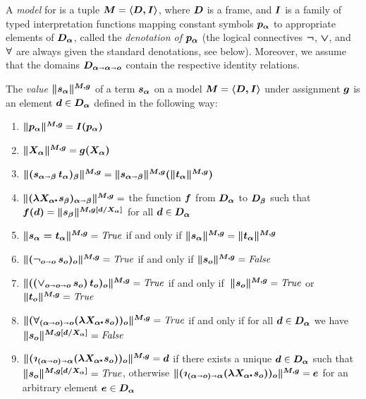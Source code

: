 \begin{definition}\label{holmodel}
  A \emph{model} for \HOL is a tuple $\boldsymbol{M}=\boldsymbol{\langle D, I \rangle}$, where
  $\boldsymbol{D}$ is a frame, and $\boldsymbol{I}$ is a family of typed interpretation
  functions mapping constant symbols $\boldsymbol{p_\alpha}$ to appropriate
  elements of $\boldsymbol{D_\alpha}$, called the \emph{denotation of $\boldsymbol{p_\alpha}$}
  (the logical connectives $\boldsymbol{\neg}$, $\boldsymbol{\vee}$, and $\boldsymbol{\forall}$ are always
  given the standard denotations, see below).  Moreover, we assume that the domains
  $\boldsymbol{D_{\alpha\shortrightarrow\alpha\shortrightarrow o}}$ contain the respective identity relations.
\end{definition}


\begin{definition}\label{holvalue}
  The \emph{value} $\boldsymbol{\| s_\alpha\|^{M,g}}$ of a \HOL term
  $\boldsymbol{s_\alpha}$ on a model $\boldsymbol{M}=\boldsymbol{\langle D, I \rangle}$ under assignment $\boldsymbol{g}$ is an element $\boldsymbol{d}\in \boldsymbol{D_\alpha}$
  defined in the following way:
\begin{enumerate}
\item $\boldsymbol{\|p_\alpha\|^{M,g}} = \boldsymbol{I(p_\alpha)}$ 
\item $\boldsymbol{\|X_\alpha\|^{M,g}} = \boldsymbol{g(X_\alpha)}$
\item $\boldsymbol{\|(s_{\alpha\shortrightarrow\beta}\, t_\alpha)_\beta\|^{M,g}} = \boldsymbol{\|s_{\alpha\shortrightarrow\beta}\|^{M,g}(\|t_\alpha\|^{M,g})}$
\item $\hol{\|(\lam{X_\alpha}s_\beta)_{\alpha\ar\beta}\|^{M,g}} = $
  the function $\boldsymbol{f}$ from $\boldsymbol{D_\alpha}$ to $\boldsymbol{D_\beta}$ such
  that $\boldsymbol{f(d)} = \boldsymbol{\|s_\beta\|^{M,g[d/X_\alpha]}}$ for all
  $\boldsymbol{d}\in \boldsymbol{D_\alpha}$
\item $\boldsymbol{\|s_\alpha = t_\alpha\|^{M,g}} = {\mathit{True}}$ if and only if $\boldsymbol{\|s_\alpha\|^{M,g}} = \boldsymbol{\|t_\alpha\|^{M,g}} $
\item $\boldsymbol{\|(\neg_{o\shortrightarrow o}\, s_o)_o\|^{M,g}} = {\mathit{True}}$ if and only if $\boldsymbol{\|s_o\|^{M,g}} = {\mathit{False}}$
\item $\boldsymbol{\|(({\vee_{o\shortrightarrow o\shortrightarrow o}}\,s_o)\,t_o)_o\|^{M,g}} =
  {\mathit{True}}$ if and only if\, $\boldsymbol{\|s_o\|^{M,g}} = {\mathit{True}}$ or $\boldsymbol{\|t_o\|^{M,g}}
  = {\mathit{True}}$
\item \sloppy $\hol{\|(\forall_{(\alpha\ar o)\ar o}(\lam{X_\alpha}
    s_o))_o\|^{M,g}} = {\True}$ if and only if for all $\boldsymbol{d}\in
  \boldsymbol{D_\alpha}$ we have $\boldsymbol{\|s_o\|^{M,g[d/X_\alpha]}} = {\mathit{False}}$
\item $\hol{\|(\Descr_{(\alpha\ar o)\ar \alpha}(\lam{X_\alpha}
    s_o))_o\|^{M,g}} = \hol{d}$ if there exists a unique $\boldsymbol{d}\in \boldsymbol{D_{\alpha}}$ such that
  $\boldsymbol{\|s_o\|^{M,g[d/X_\alpha]}} = {\mathit{True}}$, 
otherwise  $\hol{\|(\Descr_{(\alpha\ar o)\ar \alpha}(\lam{X_\alpha}
    s_o))_o\|^{M,g}} = \hol{e}$ for an arbitrary element $\boldsymbol{e}\in \boldsymbol{D_{\alpha}}$
\end{enumerate}
\end{definition}


